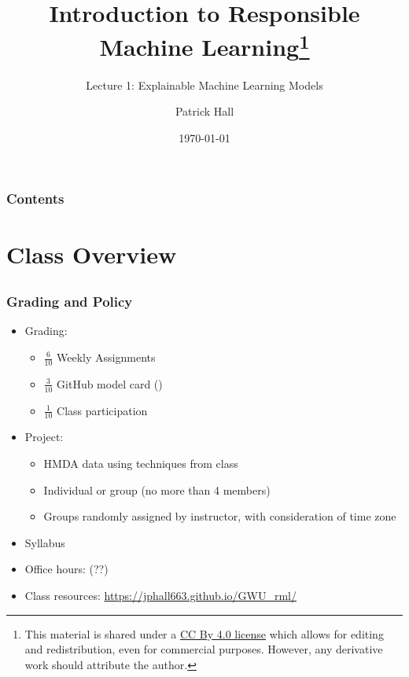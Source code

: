 \documentclass[11pt,aspectratio=169,hyperref={colorlinks}]{beamer}
\author{Patrick Hall}
\title{Introduction to Responsible Machine Learning\footnote{\tiny{This material is shared under a \href{https://creativecommons.org/licenses/by/4.0/deed.ast}{CC By 4.0 license} which allows for editing and redistribution, even for commercial purposes. However, any derivative work should attribute the author.}}}
\subtitle{Lecture 1: Explainable Machine Learning Models}
\institute{The George Washington University}
\date{\today}
\begin{document}
	
	\maketitle
	
	\begin{frame}
	
		\frametitle{Contents}
		
		\tableofcontents{}
		
	\end{frame}
	

	\section{Class Overview}
	\subsection*{}
	
	\begin{frame}
	
		\frametitle{Grading and Policy}
			
		\begin{itemize}
			\item{Grading:}
				\begin{itemize}
					\item{$\frac{6}{10}$ Weekly Assignments}
					\item{$\frac{3}{10}$ GitHub model card (\cite{model_cards})}
                    \item{$\frac{1}{10}$ Class participation}
				\end{itemize}
			\item{Project:}	
				\begin{itemize}
					\item{HMDA data using techniques from class}
					\item{Individual or group (no more than 4 members)}
					\item Groups randomly assigned by instructor, with consideration of time zone
				\end{itemize}
			\item{Syllabus}
			\item{Office hours: (??)}
			\item{Class resources: \url{https://jphall663.github.io/GWU_rml/}}	
		\end{itemize}		
			
	\end{frame}
	
\end{document}
